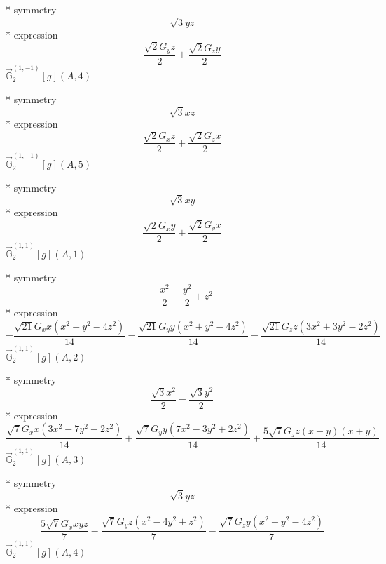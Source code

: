 \documentclass[fleqn,8pt]{jsarticle}
\begin{document}
\noindent\quad ** symmetry
\begin{dmath*}
\sqrt{3} y z
\end{dmath*}
\noindent\quad ** expression
\begin{dmath*}
\frac{\sqrt{2} G_{y} z}{2} + \frac{\sqrt{2} G_{z} y}{2}
\end{dmath*}
\noindent\quad $\vec{\mathbb{G}}_{2}^{(1,-1)}[g](A,4)$

\noindent\quad ** symmetry
\begin{dmath*}
\sqrt{3} x z
\end{dmath*}
\noindent\quad ** expression
\begin{dmath*}
\frac{\sqrt{2} G_{x} z}{2} + \frac{\sqrt{2} G_{z} x}{2}
\end{dmath*}
\noindent\quad $\vec{\mathbb{G}}_{2}^{(1,-1)}[g](A,5)$

\noindent\quad ** symmetry
\begin{dmath*}
\sqrt{3} x y
\end{dmath*}
\noindent\quad ** expression
\begin{dmath*}
\frac{\sqrt{2} G_{x} y}{2} + \frac{\sqrt{2} G_{y} x}{2}
\end{dmath*}
\noindent\quad $\vec{\mathbb{G}}_{2}^{(1,1)}[g](A,1)$

\noindent\quad ** symmetry
\begin{dmath*}
- \frac{x^{2}}{2} - \frac{y^{2}}{2} + z^{2}
\end{dmath*}
\noindent\quad ** expression
\begin{dmath*}
- \frac{\sqrt{21} G_{x} x \left(x^{2} + y^{2} - 4 z^{2}\right)}{14} - \frac{\sqrt{21} G_{y} y \left(x^{2} + y^{2} - 4 z^{2}\right)}{14} - \frac{\sqrt{21} G_{z} z \left(3 x^{2} + 3 y^{2} - 2 z^{2}\right)}{14}
\end{dmath*}
\noindent\quad $\vec{\mathbb{G}}_{2}^{(1,1)}[g](A,2)$

\noindent\quad ** symmetry
\begin{dmath*}
\frac{\sqrt{3} x^{2}}{2} - \frac{\sqrt{3} y^{2}}{2}
\end{dmath*}
\noindent\quad ** expression
\begin{dmath*}
\frac{\sqrt{7} G_{x} x \left(3 x^{2} - 7 y^{2} - 2 z^{2}\right)}{14} + \frac{\sqrt{7} G_{y} y \left(7 x^{2} - 3 y^{2} + 2 z^{2}\right)}{14} + \frac{5 \sqrt{7} G_{z} z \left(x - y\right) \left(x + y\right)}{14}
\end{dmath*}
\noindent\quad $\vec{\mathbb{G}}_{2}^{(1,1)}[g](A,3)$

\noindent\quad ** symmetry
\begin{dmath*}
\sqrt{3} y z
\end{dmath*}
\noindent\quad ** expression
\begin{dmath*}
\frac{5 \sqrt{7} G_{x} x y z}{7} - \frac{\sqrt{7} G_{y} z \left(x^{2} - 4 y^{2} + z^{2}\right)}{7} - \frac{\sqrt{7} G_{z} y \left(x^{2} + y^{2} - 4 z^{2}\right)}{7}
\end{dmath*}
\noindent\quad $\vec{\mathbb{G}}_{2}^{(1,1)}[g](A,4)$
\end{document}
